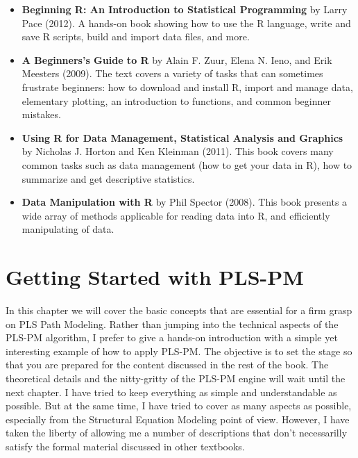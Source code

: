 \documentclass[12pt]{book}\usepackage{graphicx, color}
\begin{document}
\begin{itemize}
 \vspace{2mm}
 \item \textbf{\textsf{Beginning R: An Introduction to Statistical Programming}} by Larry Pace (2012). A hands-on book showing how to use the R language, write and save R scripts, build and import data files, and more.

\vspace{2mm}
 \item \textbf{\textsf{A Beginners's Guide to R}} by Alain F. Zuur, Elena N. Ieno, and Erik Meesters (2009). The text covers a variety of tasks that can sometimes frustrate beginners: how to download and install R, import and manage data, elementary plotting, an introduction to functions, and common beginner mistakes.
 
 \vspace{2mm}
 \item \textbf{\textsf{Using R for Data Management, Statistical Analysis and Graphics}} by Nicholas J. Horton and Ken Kleinman (2011). This book covers many common tasks such as data management (how to get your data in R), how to summarize and get descriptive statistics.

 \vspace{2mm}
 \item \textbf{\textsf{Data Manipulation with R}} by Phil Spector (2008). This book presents a wide array of methods applicable for reading data into R, and efficiently manipulating of data.
\end{itemize}





\chapter{Getting Started with PLS-PM}
In this chapter we will cover the basic concepts that are essential for a firm grasp on PLS Path Modeling. Rather than jumping into the technical aspects of the PLS-PM algorithm, I prefer to give a hands-on introduction with a simple yet interesting example of how to apply PLS-PM. The objective is to set the stage so that you are prepared for the content discussed in the rest of the book. The theoretical details and the nitty-gritty of the PLS-PM engine will wait until the next chapter. I have tried to keep everything as simple and understandable as possible. But at the same time, I have tried to cover as many aspects as possible, especially from the Structural Equation Modeling point of view. However, I have taken the liberty of allowing me a number of descriptions that don't necessarilly satisfy the formal material discussed in other textbooks.
\end{document}

